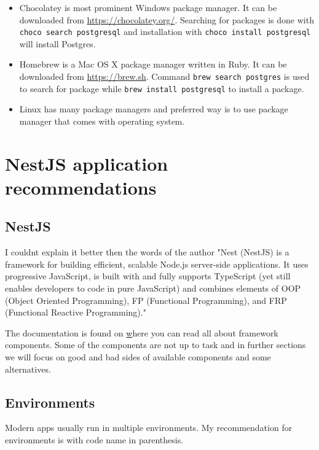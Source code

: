 \documentclass[lang=en,color=green]{elegantbook}
\begin{document}
\begin{itemize}[leftmargin=*]
    \item Chocolatey is most prominent Windows package manager. It can be downloaded from \href{https://chocolatey.org/}{https://chocolatey.org/}.
          Searching for packages is done with \texttt{choco search postgresql}
          and installation with \texttt{choco install postgresql} will install Postgres.
    \item Homebrew is a Mac OS X package manager written in Ruby.
          It can be downloaded from \href{https://brew.sh}{https://brew.sh}.
          Command \texttt{brew search postgres}
          is used to search for package while \texttt{brew install postgresql} to install a package.
    \item Linux has many package managers and preferred way is to use package manager
          that comes with operating system.
\end{itemize}

\chapter{NestJS application recommendations}

\section{NestJS}

I couldnt explain it better then the words of the author "Nest (NestJS) is a framework for building
efficient, scalable Node.js server-side applications.
It uses progressive JavaScript, is built with and fully supports
TypeScript (yet still enables developers to code in pure JavaScript)
and combines elements of OOP (Object Oriented Programming),
FP (Functional Programming), and FRP (Functional Reactive Programming)."

The documentation is found on \href{https://docs.nestjs.com/} where you can
read all about framework components. Some of the components are
not up to task and in further sections we will focus on good and bad
sides of available components and some alternatives.

\section{Environments}
Modern apps usually run in multiple environments. My recommendation
for environments is with code name in parenthesis.
\end{document}
